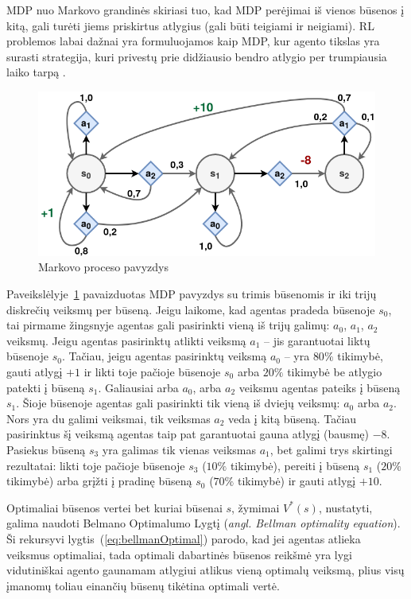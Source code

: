 \documentclass{VUMIFPSbakalaurinis}
\begin{document}
{	MDP nuo Markovo grandinės skiriasi tuo, kad MDP perėjimai iš vienos būsenos į kitą, gali turėti jiems priskirtus atlygius (gali būti teigiami ir neigiami). RL problemos labai dažnai yra formuluojamos kaip MDP, kur agento tikslas yra surasti strategija, kuri privestų prie didžiausio bendro atlygio per trumpiausia laiko tarpą \cite{handson}.\par
	
	\begin{figure}[H]
		\centering
		\includegraphics[scale=0.33]{img/mdp}
		\caption{Markovo proceso pavyzdys}
		\label{img:mdp}
	\end{figure} 
	
	Paveikslėlyje~\ref{img:mdp} pavaizduotas MDP pavyzdys su trimis būsenomis ir iki trijų diskrečių veiksmų per būseną. Jeigu laikome, kad agentas pradeda būsenoje \(s_0\), tai pirmame žingsnyje agentas gali pasirinkti vieną iš trijų galimų: \(a_0\), \(a_1\), \(a_2\) veiksmų. Jeigu agentas pasirinktų atlikti veiksmą \(a_1\) -- jis garantuotai liktų būsenoje \(s_0\). Tačiau, jeigu agentas pasirinktų veiksmą \(a_0\) -- yra \(80\%\) tikimybė, gauti atlygį \(+1\) ir likti toje pačioje būsenoje \(s_0\) arba \(20\%\) tikimybė be atlygio patekti į būseną \(s_1\). Galiausiai arba \(a_0\), arba \(a_2\) veiksmu agentas pateiks į būseną \(s_1\). Šioje būsenoje agentas gali pasirinkti tik vieną iš dviejų veiksmų: \(a_0\) arba \(a_2\). Nors yra du galimi veiksmai, tik veiksmas \(a_2\) veda į kitą būseną. Tačiau pasirinktus šį veiksmą agentas taip pat garantuotai gauna atlygį (bausmę) \(-8\). Pasiekus būseną \(s_3\) yra galimas tik vienas veiksmas \(a_1\), bet galimi trys skirtingi rezultatai: likti toje pačioje būsenoje \(s_3\) (\(10\%\) tikimybė), pereiti į būseną \(s_1\) (\(20\%\) tikimybė) arba grįžti į pradinę būseną \(s_0\) (\(70\%\) tikimybė) ir gauti atlygį \(+10\).\par
	
	Optimaliai būsenos vertei bet kuriai būsenai \(s\), žymimai \(V^*(s)\), nustatyti, galima naudoti Belmano Optimalumo Lygtį (\textit{angl. Bellman optimality equation}). Ši rekursyvi lygtis~(\ref{eq:bellmanOptimal}) parodo, kad jei agentas atlieka veiksmus optimaliai, tada optimali dabartinės būsenos reikšmė yra lygi vidutiniškai agento gaunamam atlygiui atlikus vieną optimalų veiksmą, plius visų įmanomų toliau einančių būsenų tikėtina optimali vertė.
	
}
\end{document}
